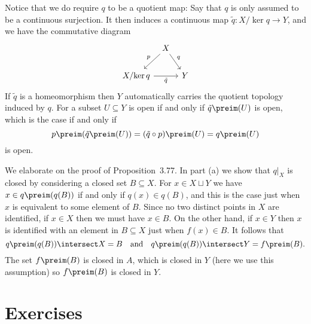 \documentclass[article, a4paper, 11pt, oneside]{memoir}
\numberwithin{equation}{chapter}
\theoremstyle{nonumberplain}
\renewcommand{\disunion}{\sqcup}
\begin{document}
\begin{remarkbreak}
    Notice that we do require $q$ to be a quotient map: Say that $q$ is only assumed to be a continuous surjection. It then induces a continuous map $\tilde{q} \colon X/{\ker q} \to Y$, and we have the commutative diagram
    \begin{equation*}
        \begin{tikzcd}[column sep=tiny]
            & X
                \ar[dl, "p", swap]
                \ar[dr, "q"] \\
            X/{\ker q}
                \ar[rr, "\tilde{q}", swap]
            && Y
        \end{tikzcd}
    \end{equation*}
    If $\tilde{q}$ is a homeomorphism then $Y$ automatically carries the quotient topology induced by $q$. For a subset $U \subseteq Y$ is open if and only if $\tilde{q}\preim(U)$ is open, which is the case if and only if
    \begin{equation*}
        p\preim(\tilde{q}\preim(U))
            = (\tilde{q} \circ p)\preim(U)
            = q\preim(U)
    \end{equation*}
    is open.
\end{remarkbreak}


\begin{remarkbreak}
    We elaborate on the proof of Proposition~3.77. In part (a) we show that $q|_X$ is closed by considering a closed set $B \subseteq X$. For $x \in X \disunion Y$ we have $x \in q\preim(q(B))$ if and only if $q(x) \in q(B)$, and this is the case just when $x$ is equivalent to some element of $B$. Since no two distinct points in $X$ are identified, if $x \in X$ then we must have $x \in B$. On the other hand, if $x \in Y$ then $x$ is identified with an element in $B \subseteq X$ just when $f(x) \in B$. It follows that
    \begin{equation*}
        q\preim(q(B)) \intersect X = B 
        \quad \text{and} \quad
        q\preim(q(B)) \intersect Y = f\preim(B).
    \end{equation*}
    The set $f\preim(B)$ is closed in $A$, which is closed in $Y$ (here we use this assumption) so $f\preim(B)$ is closed in $Y$.
\end{remarkbreak}


\section*{Exercises}
\end{document}
